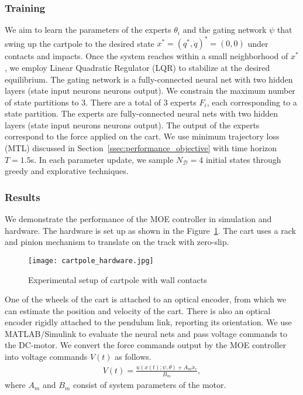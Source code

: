 \subsubsection{Training}
\label{sssec:cartpole_training}

We aim to learn the parameters of the experts $\theta_i$ and the gating network
$\psi$ that swing up the cartpole to the desired state $x^* = (q^*, \dot{q})^* =
(0, 0)$ under contacts and impacts.
%
Once the system reaches within a small neighborhood of $x^*$, we employ Linear
Quadratic Regulator (LQR) to stabilize at the desired equilibrium.
%
The gating network is a fully-connected neural net with two hidden layers (state
input  neurons  neurons  output).
% 
We constrain the maximum number of state partitions to 3.
%
There are a total of 3 experts $F_i$, each corresponding to a state
partition.
%
The experts are fully-connected neural nets with two hidden layers (state input
 neurons  neurons  output).
%
The output of the experts correspond to the force applied on the cart.
%
We use minimum trajectory loss (MTL) discussed in
Section~\ref{ssec:performance_objective} with time horizon $T=1.5$s.
%
In each parameter update, we sample $N_{\mathcal{D}}=4$ initial states through
greedy and explorative techniques.
%

\subsubsection{Results}

We demonstrate the performance of the MOE controller in simulation and hardware. 
%
The hardware is set up as shown in the Figure~\ref{fig:cartpole_hardware}.
% 
The cart uses a rack and pinion mechanism to translate on the track with
zero-slip.
%
\begin{figure}[tb]
    \centering
    \texttt{[image: cartpole\_hardware.jpg]}
    \caption{Experimental setup of cartpole with wall contacts}
    \label{fig:cartpole_hardware}
\end{figure}
One of the wheels of the cart is attached to an optical encoder, from which we
can estimate the position and velocity of the cart.
%
There is also an optical encoder rigidly attached to the pendulum link,
reporting its orientation. 
%
%
We use MATLAB/Simulink to evaluate the neural nets and pass voltage commands to
the DC-motor.
%
We convert the force commands output by the MOE controller into voltage
commands $V(t)$ as follows.
\begin{align*}
    V(t) = \frac{u(x(t); \psi, \theta) + A_m \dot{x}_c}{B_m},
\end{align*} 
\noindent where $A_m$ and $B_m$ consist of system parameters of the motor.


